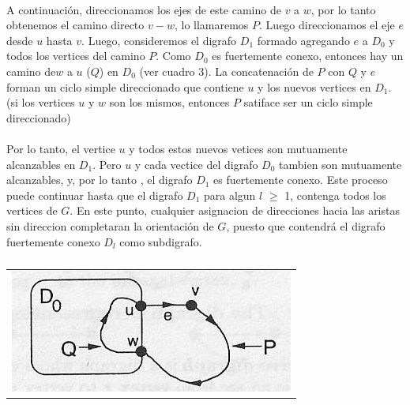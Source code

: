 \paragraph{}
A continuación, direccionamos los ejes de este camino de $v$ a $w$, por lo tanto obtenemos el camino directo $v-w$, lo llamaremos $P$. Luego direccionamos el eje $e$ desde $u$ hasta $v$. Luego, consideremos el digrafo $D_1$ formado agregando $e$ a $D_0$ y todos los vertices del camino $P$. Como $D_0$ es fuertemente conexo, entonces hay un camino de$ w$ a $u$ ($Q$) en $D_0$ (ver cuadro 3). La concatenación de $P$ con $Q$ y $e$ forman un ciclo simple direccionado que contiene $u$ y los nuevos vertices en $D_1$. (si los vertices $u$ y $w$ son los mismos, entonces $P$ satiface ser un ciclo simple direccionado)



\paragraph{}
Por lo tanto, el vertice $u$ y todos estos nuevos vetices son mutuamente alcanzables en $D_1$. Pero $u$ y cada vectice del digrafo $D_0$ tambien son mutuamente alcanzables, y, por lo tanto , el digrafo $D_1$ es fuertemente conexo. Este proceso puede continuar hasta que el digrafo $D_1$ para algun $l$ $\geq$ 1, contenga todos los vertices de $G$. En este punto, cualquier asignacion de direcciones hacia las aristas sin direccion completaran la orientación de $G$, puesto que contendrá el digrafo fuertemente conexo $D_l$ como subdigrafo.



	\begin{table}[h!] %
		\centering %
			\begin{tabular}{c}
				\includegraphics[scale=0.7]{./figura3.jpg} 

				\end{tabular}
				\caption{} %
				\label{} %
	\end{table}

